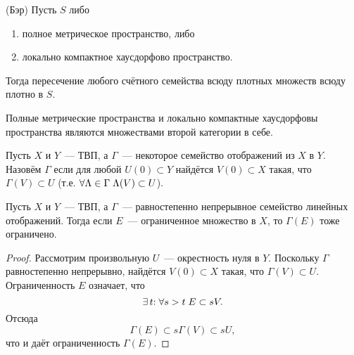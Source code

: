 \documentclass{notes}
\begin{document}
	\begin{thm}(Бэр) \label{thm:baire}
		Пусть $S$ либо
		\begin{enumerate}
			\item полное метрическое пространство, либо
			\item локально компактное хаусдорфово пространство.
		\end{enumerate}
		Тогда пересечение любого счётного семейства всюду плотных множеств всюду плотно в $S$.
	\end{thm}

	\begin{cor} \label{cor:cat}
		Полные метрические пространства и локально компактные хаусдорфовы пространства являются множествами второй категории в себе.
	\end{cor}

	\begin{de}
		Пусть $X$ и $Y$~--- ТВП, а $\Gamma$~--- некоторое семейство отображений из $X$ в $Y$. Назовём $\Gamma$  если для любой $U(0) \subset Y$ найдётся $V(0) \subset X$ такая, что $\Gamma(V) \subset U$ (т.е. $\forall \Lambda \in  \Gamma \; \Lambda(V) \subset U$).
	\end{de}

	\begin{lm} \label{lm:uni-bound}
		Пусть $X$ и $Y$~--- ТВП, а $\Gamma$~--- равностепенно непрерывное семейство линейных отображений. Тогда если $E$~--- ограниченное множество в $X$, то $\Gamma(E)$ тоже ограничено.
		\begin{proof}
			Рассмотрим произвольную $U$~--- окрестность нуля в $Y$. Поскольку $\Gamma$ равностепенно непрерывно, найдётся $V(0) \subset X$ такая, что $\Gamma(V) \subset U$. Ограниченность $E$ означает, что
			\[
				\exists \, t \text{\text{:}} \; \forall s > t \; E \subset sV.  
			\]
			Отсюда
			\[
				\Gamma(E) \subset s\Gamma(V) \subset sU,
			\]
			что и даёт ограниченность $\Gamma(E)$.
		\end{proof}
	\end{lm}
\end{document}
